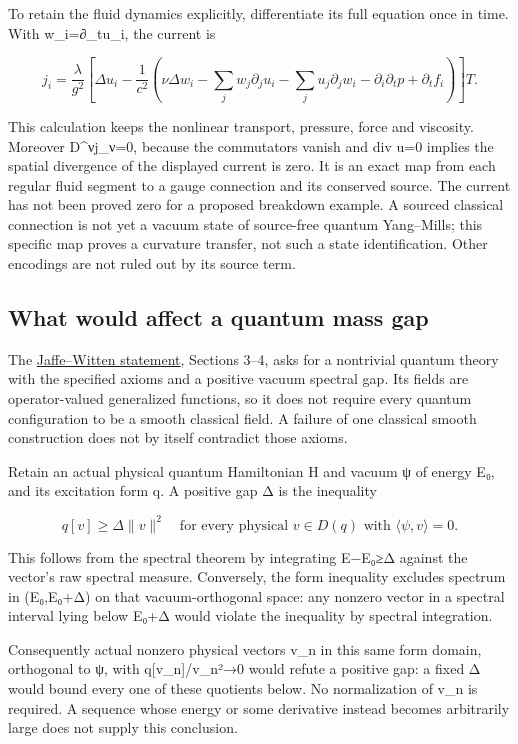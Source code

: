 To retain the fluid dynamics explicitly, differentiate its full equation
once in time. With w\_i=∂\_tu\_i, the current is

\[
j_i=\frac{\lambda}{g^2}\left[
\Delta u_i-\frac1{c^2}\left(
\nu\Delta w_i-\sum_jw_j\partial_ju_i-\sum_ju_j\partial_jw_i
-\partial_i\partial_tp+\partial_tf_i\right)\right]T.
\]

This calculation keeps the nonlinear transport, pressure, force and
viscosity. Moreover D\^{}νj\_ν=0, because the commutators vanish and div
u=0 implies the spatial divergence of the displayed current is zero. It
is an exact map from each regular fluid segment to a gauge connection
and its conserved source. The current has not been proved zero for a
proposed breakdown example. A sourced classical connection is not yet a
vacuum state of source-free quantum Yang--Mills; this specific map
proves a curvature transfer, not such a state identification. Other
encodings are not ruled out by its source term.

\subsection{What would affect a quantum mass
gap}\label{gauge-and-navier-stokes-bridge-md-what-would-affect-a-quantum-mass-gap}

The
\href{https://www.claymath.org/wp-content/uploads/2022/06/yangmills.pdf}{Jaffe--Witten
statement}, Sections 3--4, asks for a nontrivial quantum theory with the
specified axioms and a positive vacuum spectral gap. Its fields are
operator-valued generalized functions, so it does not require every
quantum configuration to be a smooth classical field. A failure of one
classical smooth construction does not by itself contradict those
axioms.

Retain an actual physical quantum Hamiltonian H and vacuum ψ of energy
E₀, and its excitation form q. A positive gap Δ is the inequality

\[
q[v]\geq\Delta\|v\|^2\quad
\text{for every physical }v\in D(q)\text{ with }\langle\psi,v\rangle=0.
\]

This follows from the spectral theorem by integrating E−E₀≥Δ against the
vector's raw spectral measure. Conversely, the form inequality excludes
spectrum in (E₀,E₀+Δ) on that vacuum-orthogonal space: any nonzero
vector in a spectral interval lying below E₀+Δ would violate the
inequality by spectral integration.

Consequently actual nonzero physical vectors v\_n in this same form
domain, orthogonal to ψ, with
q{[}v\_n{]}/\textbar\textbar v\_n\textbar\textbar²→0 would refute a
positive gap: a fixed Δ would bound every one of these quotients below.
No normalization of v\_n is required. A sequence whose energy or some
derivative instead becomes arbitrarily large does not supply this
conclusion.


